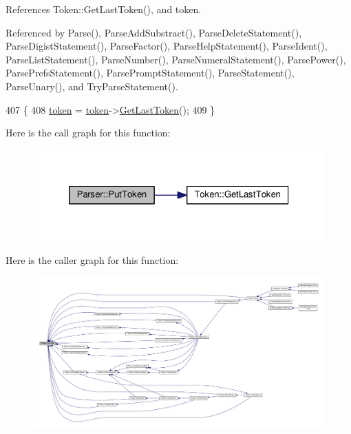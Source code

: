 References Token\+::\+Get\+Last\+Token(), and token.



Referenced by Parse(), Parse\+Add\+Substract(), Parse\+Delete\+Statement(), Parse\+Digist\+Statement(), Parse\+Factor(), Parse\+Help\+Statement(), Parse\+Ident(), Parse\+List\+Statement(), Parse\+Number(), Parse\+Numeral\+Statement(), Parse\+Power(), Parse\+Prefs\+Statement(), Parse\+Prompt\+Statement(), Parse\+Statement(), Parse\+Unary(), and Try\+Parse\+Statement().


\begin{DoxyCode}
407 \{
408     \hyperlink{classParser_a467028559d31c5b33f16ca8be56715cc}{token} = \hyperlink{classParser_a467028559d31c5b33f16ca8be56715cc}{token}->\hyperlink{structToken_af5213b25192a01f526143461ab47e6af}{GetLastToken}();
409 \}
\end{DoxyCode}


Here is the call graph for this function\+:
\nopagebreak
\begin{figure}[H]
\begin{center}
\leavevmode
\includegraphics[width=320pt]{d0/d40/classParser_adb5c3a188b36f7ecb198ae30f06338b3_cgraph}
\end{center}
\end{figure}




Here is the caller graph for this function\+:
\nopagebreak
\begin{figure}[H]
\begin{center}
\leavevmode
\includegraphics[width=350pt]{d0/d40/classParser_adb5c3a188b36f7ecb198ae30f06338b3_icgraph}
\end{center}
\end{figure}



